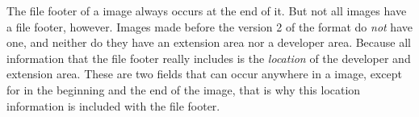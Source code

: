 \begin{refsection}
  The file footer of a \tga image always occurs at the end of it. But
  not all \tga images have a file footer, however. Images made before
  the version 2 of the \tga format do \textit{not} have one, and
  neither do they have an extension area nor a developer area. Because
  all information that the file footer really includes is the
  \textit{location} of the developer and extension area. These are two
  fields that can occur anywhere in a \tga image, except for in the
  beginning and the end of the image, that is why this location
  information is included with the file footer.

  \printbibliography[heading=subbibliography]

\end{refsection}